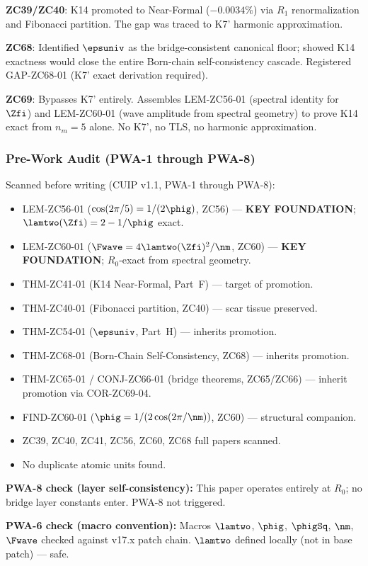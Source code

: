 \documentclass[12pt, a4paper]{article}
\begin{document}
\begin{keybox}[title={What ZC69 Adds to the GAP-ZC68-01 Chain}]
\textbf{ZC39/ZC40}: K14 promoted to Near-Formal ($-0.0034\%$)
via $R_1$ renormalization and Fibonacci partition.
The gap was traced to K7' harmonic approximation.

\textbf{ZC68}: Identified $\epsuniv$ as the bridge-consistent
canonical floor; showed K14 exactness would close
the entire Born-chain self-consistency cascade.
Registered GAP-ZC68-01 (K7' exact derivation required).

\textbf{ZC69}: Bypasses K7' entirely. Assembles LEM-ZC56-01
(spectral identity for $\Zfi$) and LEM-ZC60-01
(wave amplitude from spectral geometry) to prove
K14 exact from $n_m = 5$ alone.
No K7', no TLS, no harmonic approximation.
\end{keybox}

\subsubsection{Pre-Work Audit (PWA-1 through PWA-8)}

\begin{formalbox}[title={Pre-Work Audit Record --- ZC69}]
Scanned before writing (CUIP v1.1, PWA-1 through PWA-8):
\begin{itemize}[leftmargin=2em, noitemsep]
  \item LEM-ZC56-01 ($\cos(2\pi/5) = 1/(2\phig)$, ZC56)
    --- \textbf{KEY FOUNDATION}; $\lamtwo(\Zfi) = 2-1/\phig$ exact.
  \item LEM-ZC60-01 ($\Fwave = 4\lamtwo(\Zfi)^2/\nm$, ZC60)
    --- \textbf{KEY FOUNDATION}; $R_0$-exact from spectral geometry.
  \item THM-ZC41-01 (K14 Near-Formal, Part~F) --- target of promotion.
  \item THM-ZC40-01 (Fibonacci partition, ZC40) --- scar tissue preserved.
  \item THM-ZC54-01 ($\epsuniv$, Part~H) --- inherits promotion.
  \item THM-ZC68-01 (Born-Chain Self-Consistency, ZC68) --- inherits promotion.
  \item THM-ZC65-01 / CONJ-ZC66-01 (bridge theorems, ZC65/ZC66)
    --- inherit promotion via COR-ZC69-04.
  \item FIND-ZC60-01 ($\phig = 1/(2\cos(2\pi/\nm))$, ZC60)
    --- structural companion.
  \item ZC39, ZC40, ZC41, ZC56, ZC60, ZC68 full papers scanned.
  \item No duplicate atomic units found.
\end{itemize}

\textbf{PWA-8 check (layer self-consistency):}
This paper operates entirely at $R_0$; no bridge layer
constants enter. PWA-8 not triggered.

\textbf{PWA-6 check (macro convention):}
Macros $\lamtwo$, $\phig$, $\phigSq$, $\nm$, $\Fwave$
checked against v17.x patch chain.
$\lamtwo$ defined locally (not in base patch) --- safe.
\end{formalbox}
\end{document}
